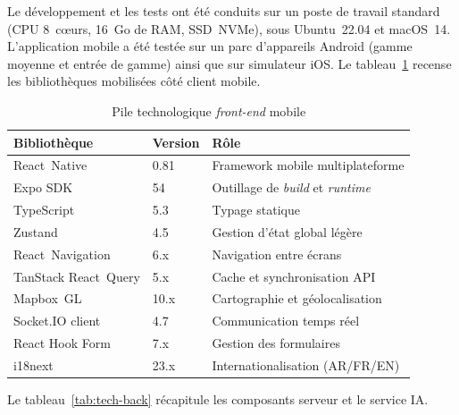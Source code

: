 \documentclass[12pt, a4paper, oneside]{report}
\begin{document}
Le développement et les tests ont été conduits sur un poste de travail standard (CPU 8~cœurs, 16~Go de RAM, SSD~NVMe), sous Ubuntu~22.04 et macOS~14. L'application mobile a été testée sur un parc d'appareils Android (gamme moyenne et entrée de gamme) ainsi que sur simulateur iOS. Le tableau~\ref{tab:tech-front} recense les bibliothèques mobilisées côté client mobile.

\begin{table}[H]
\centering
\footnotesize
\begin{tabularx}{\textwidth}{|l|l|X|}
\hline
\rowcolor{rohlight}
\textbf{Bibliothèque} & \textbf{Version} & \textbf{Rôle} \\
\hline
React~Native & 0.81 & Framework mobile multiplateforme \\
\hline
Expo SDK & 54 & Outillage de \textit{build} et \textit{runtime} \\
\hline
TypeScript & 5.3 & Typage statique \\
\hline
Zustand & 4.5 & Gestion d'état global légère \\
\hline
React~Navigation & 6.x & Navigation entre écrans \\
\hline
TanStack React~Query & 5.x & Cache et synchronisation API \\
\hline
Mapbox~GL & 10.x & Cartographie et géolocalisation \\
\hline
Socket.IO client & 4.7 & Communication temps réel \\
\hline
React Hook Form & 7.x & Gestion des formulaires \\
\hline
i18next & 23.x & Internationalisation (AR/FR/EN) \\
\hline
\end{tabularx}
  \caption{Pile technologique \textit{front-end} mobile}
  \label{tab:tech-front}
\end{table}

Le tableau~\ref{tab:tech-back} récapitule les composants serveur et le service IA.
\end{document}
